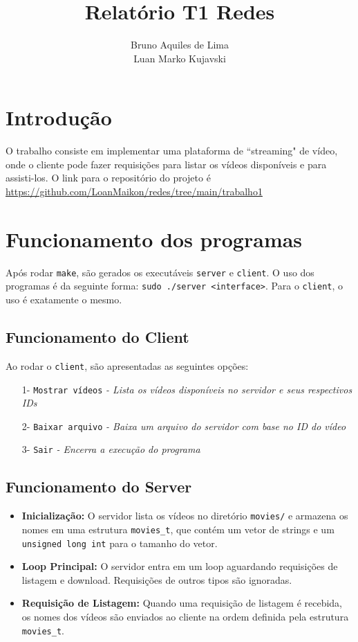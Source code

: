 \documentclass[a4paper, 12pt]{article}
\title{\textbf{Relatório T1 Redes}}
\author{Bruno Aquiles de Lima \\ Luan Marko Kujavski}
\date{}
\begin{document}
\maketitle

\section{Introdução}
O trabalho consiste em implementar uma plataforma de ``streaming" de vídeo, onde o 
cliente pode fazer requisições para listar os vídeos disponíveis e para assisti-los.
O link para o repositório do projeto é \url{https://github.com/LoanMaikon/redes/tree/main/trabalho1}

\section{Funcionamento dos programas}
Após rodar \texttt{make}, são gerados os executáveis \texttt{server} e \texttt{client}. 
O uso dos programas é da seguinte forma: \texttt{sudo ./server <interface>}. Para o
\texttt{client}, o uso é exatamente o mesmo.

\subsection{Funcionamento do Client}
Ao rodar o \texttt{client}, são apresentadas as seguintes opções:
\begin{enumerate}
    \setlength\itemsep{-0.5em}
    \item[1-]\texttt{Mostrar vídeos} \textit{\small{- Lista os vídeos disponíveis no servidor e seus respectivos IDs}}
    \item[2-]\texttt{Baixar arquivo} \textit{\small{- Baixa um arquivo do servidor com base no ID do vídeo}}
    \item[3-]\texttt{Sair} \textit{\small{- Encerra a execução do programa}}
\end{enumerate}

\subsection{Funcionamento do Server}
\begin{itemize}
    \item\textbf{Inicialização:} O servidor lista os vídeos no diretório \texttt{movies/}
        e armazena os nomes em uma estrutura \texttt{movies\_t}, que contém um vetor de strings
        e um \texttt{unsigned long int} para o tamanho do vetor.

    \item\textbf{Loop Principal:} O servidor entra em um loop aguardando requisições
        de listagem e download. Requisições de outros tipos são ignoradas.

    \item\textbf{Requisição de Listagem:} Quando uma requisição de listagem é recebida,
        os nomes dos vídeos são enviados ao cliente na ordem definida pela
        estrutura \texttt{movies\_t}.
\end{itemize}
\end{document}
